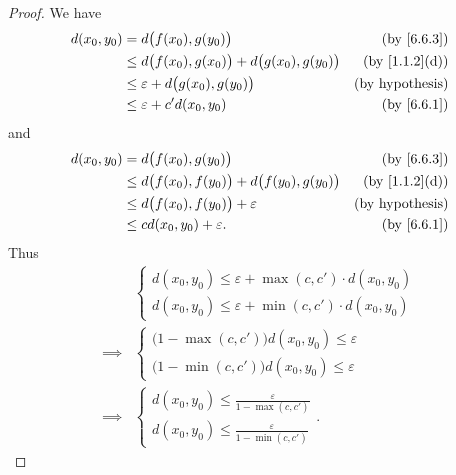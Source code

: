\begin{proof}
  We have
  \begin{align*}
    d(x_0, y_0) & = d\big(f(x_0), g(y_0)\big)                                & \text{(by \cref{6.6.3})}    \\
                & \leq d\big(f(x_0), g(x_0)\big) + d\big(g(x_0), g(y_0)\big) & \text{(by \cref{1.1.2}(d))} \\
                & \leq \varepsilon + d\big(g(x_0), g(y_0)\big)               & \text{(by hypothesis)}      \\
                & \leq \varepsilon + c' d(x_0, y_0)                          & \text{(by \cref{6.6.1})}
  \end{align*}
  and
  \begin{align*}
    d(x_0, y_0) & = d\big(f(x_0), g(y_0)\big)                                & \text{(by \cref{6.6.3})}    \\
                & \leq d\big(f(x_0), f(y_0)\big) + d\big(f(y_0), g(y_0)\big) & \text{(by \cref{1.1.2}(d))} \\
                & \leq d\big(f(x_0), f(y_0)\big) + \varepsilon               & \text{(by hypothesis)}      \\
                & \leq c d(x_0, y_0) + \varepsilon.                          & \text{(by \cref{6.6.1})}
  \end{align*}
  Thus
  \begin{align*}
             & \begin{cases}
                 d(x_0, y_0) \leq \varepsilon + \max(c, c') \cdot d(x_0, y_0) \\
                 d(x_0, y_0) \leq \varepsilon + \min(c, c') \cdot d(x_0, y_0)
               \end{cases} \\
    \implies & \begin{cases}
                 \big(1 - \max(c, c')\big) d(x_0, y_0) \leq \varepsilon \\
                 \big(1 - \min(c, c')\big) d(x_0, y_0) \leq \varepsilon
               \end{cases}       \\
    \implies & \begin{cases}
                 d(x_0, y_0) \leq \frac{\varepsilon}{1 - \max(c, c')} \\
                 d(x_0, y_0) \leq \frac{\varepsilon}{1 - \min(c, c')}
               \end{cases}.
  \end{align*}
\end{proof}
